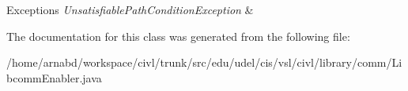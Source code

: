\begin{DoxyExceptions}{Exceptions}
{\em Unsatisfiable\+Path\+Condition\+Exception} & \\
\hline
\end{DoxyExceptions}


The documentation for this class was generated from the following file\+:\begin{DoxyCompactItemize}
\item 
/home/arnabd/workspace/civl/trunk/src/edu/udel/cis/vsl/civl/library/comm/Libcomm\+Enabler.\+java\end{DoxyCompactItemize}
